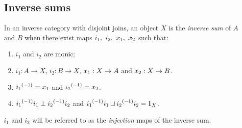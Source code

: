 \subsection{Inverse sums} %
\label{sub:inverse_sums}

\begin{definition}\label{def:inverse_sum}
  In an inverse category with disjoint joins, an object $X$ is the \emph{inverse sum} of $A$ and
  $B$ when there exist maps $i_1,\ i_2,\ \xa,\ \xb$ such that:
  \begin{enumerate}[{(}i{)}]
    \item $i_1$ and $i_2$ are monic;
    \item $i_1 : A \to X$, $i_2: B \to X$, $x_1: X \to A$ and $x_2: X \to B$.
    \item ${i_1}^{(-1)} = x_1$ and ${i_2}^{(-1)} = x_2$.
    \item ${i_1}^{(-1)}i_1 \perp {i_2}^{(-1)}i_2$ and ${i_1}^{(-1)}i_1 \sqcup {i_2}^{(-1)}i_2 = 1_X$.
  \end{enumerate}
  $i_1$ and $i_2$ will be referred to as the \emph{injection} maps of the inverse sum.
\end{definition}

